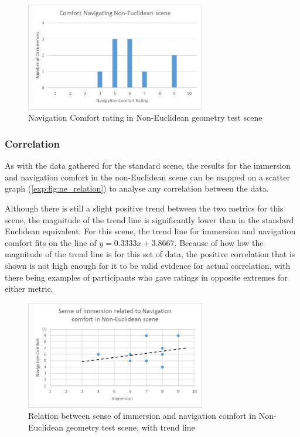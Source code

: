 				\begin{figure}[h]
					\includegraphics[width=0.7\textwidth]{Images/NE_Comfort}
					\centering
					\caption{Navigation Comfort rating in Non-Euclidean geometry test scene}
					\label{exp:fig:ne_comfort}
				\end{figure}

			\subsubsection{Correlation}

				As with the data gathered for the standard scene, the results for the immersion and navigation comfort in the non-Euclidean scene can be mapped on a scatter graph (\autoref{exp:fig:ne_relation}) to analyse any correlation between the data.

				Although there is still a slight positive trend between the two metrics for this scene, the magnitude of the trend line is significantly lower than in the standard Euclidean equivalent.
				For this scene, the trend line for immersion and navigation comfort fits on the line of $y = 0.3333x + 3.8667$.
				Because of how low the magnitude of the trend line is for this set of data, the positive correlation that is shown is not high enough for it to be valid evidence for actual correlation, with there being examples of participants who gave ratings in opposite extremes for either metric.

				\begin{figure}[h]
					\includegraphics[width=0.7\textwidth]{Images/NE_Relation}
					\centering
					\caption{Relation between sense of immersion and navigation comfort in Non-Euclidean geometry test scene, with trend line}
					\label{exp:fig:ne_relation}
				\end{figure}

